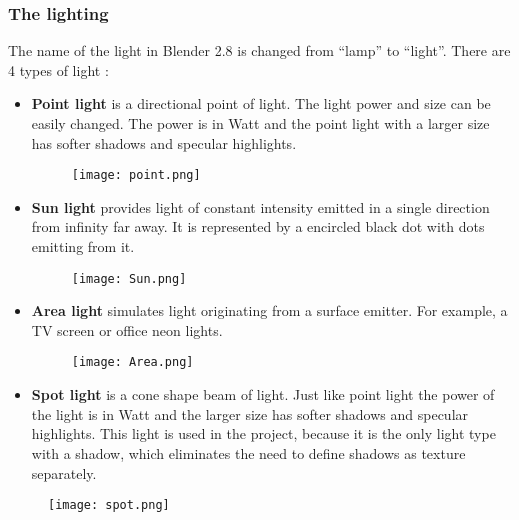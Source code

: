 \documentclass{article}
\begin{document}
\subsubsection{The lighting}
\par
The name of the light in Blender 2.8 is changed from ``lamp'' to ``light''. There are 4 types of light :
  \begin{itemize}

  \item\textbf{Point light} is a directional point of light. The light power and size can be easily changed. The power is in Watt and the point light with a larger size has softer shadows and specular highlights. \newline
 \begin{figure}[htp]
            \centering
            \texttt{[image: point.png]}
        \end{figure}

  \item\textbf{Sun light} provides light of constant intensity emitted in a single direction from infinity far away. It is represented by a encircled black dot with dots emitting from it. \par
 \begin{figure}[htp]
           \centering
            \texttt{[image: Sun.png]}
           \end{figure}

  \item\textbf{Area light} simulates light originating from a surface emitter. For example, a TV screen or office neon lights. \newline
 \begin{figure}[htp]
           \centering
            \texttt{[image: Area.png]}
            
            \end{figure}
\item\textbf{Spot light} is a cone shape beam of light. Just like point light the power of the light is in Watt and the larger size has softer shadows and specular highlights. This light is used in the project, because it is the only light type with a shadow, which eliminates the need to define shadows as texture separately.
 \end{itemize}
 
 \begin{figure}[htp]
          \centering
            \texttt{[image: spot.png]}
\end{figure}
\end{document}
